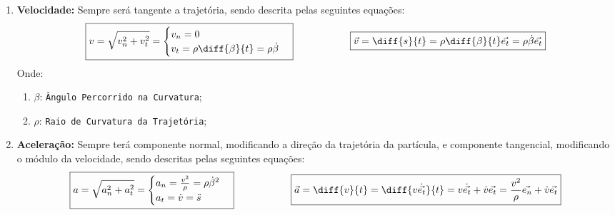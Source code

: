 \documentclass{article}
\begin{document}
                \begin{enumerate}[noitemsep]
                    \item \textbf{Velocidade:} Sempre será tangente a trajetória, sendo descrita pelas seguintes equações:
                        \begin{equation}
                            \boxed{
                                v = \sqrt{v_{n}^{2} + v_{t}^{2}} =
                                \begin{cases}
                                    v_{n} = 0\\
                                    v_{t} = \rho \diff{\beta}{t} = \rho \dot{\beta}\\
                                \end{cases}
                            }
                            \hspace{20mm}
                            \boxed{
                                \vec{v} = \diff{s}{t} = \rho \diff{\beta}{t} \vec{e_{t}} = \rho \dot{\beta} \vec{e_{t}}
                            }
                        \end{equation}
                    Onde:
                        \begin{enumerate}[noitemsep]
                            \item $\beta$: \texttt{Ângulo Percorrido na Curvatura};
                            \item $\rho$: \texttt{Raio de Curvatura da Trajetória};
                        \end{enumerate}

                    \item \textbf{Aceleração:} Sempre terá componente normal, modificando a direção da trajetória da partícula, e componente tangencial, modificando o módulo da velocidade, sendo descritas pelas seguintes equações:
                        \begin{equation}
                            \boxed{
                                a = \sqrt{a_{n}^{2} + a_{t}^{2}} =
                                \begin{cases}
                                    a_{n} = \frac{v^{2}}{\rho} = \rho \dot{\beta}^{2}\\
                                    a_{t} = \dot{v} = \ddot{s}\\
                                \end{cases}
                            }
                            \hspace{20mm}
                            \boxed{
                                \vec{a} = \diff{v}{t} = \diff{v\dot{\vec{e_{t}}}}{t} = v \dot{\vec{e_{t}}} + \dot{v}\vec{e_{t}} = \frac{v^{2}}{\rho}\vec{e_{n}} + \dot{v}\vec{e_{t}}
                            }
                        \end{equation}
                \end{enumerate}
\end{document}
